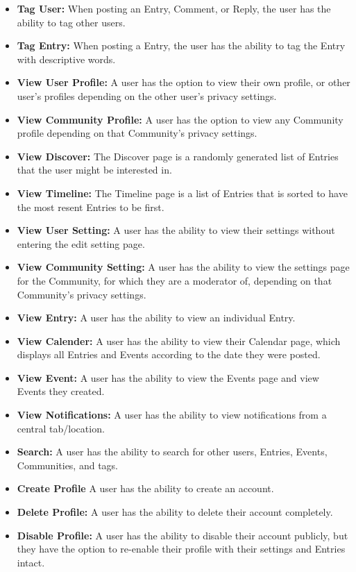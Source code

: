 \documentclass[letterpaper, 10, draftclsnofoot, onecolumn]{IEEEtran}
\begin{document}
\begin{itemize}
\item \textbf{Tag User: } When posting an Entry, Comment, or Reply, the user has the ability to tag other users.
\item \textbf{Tag Entry: } When posting a Entry, the user has the ability to tag the Entry with descriptive words.

\item \textbf{View User Profile: } A user has the option to view their own profile, or other user's profiles depending on the other user's privacy settings.
\item \textbf{View Community Profile: } A user has the option to view any Community profile depending on that Community's privacy settings.
\item \textbf{View Discover: } The Discover page is a randomly generated list of Entries that the user might be interested in.
\item \textbf{View Timeline: } The Timeline page is a list of Entries that is sorted to have the most resent Entries to be first.
\item \textbf{View User Setting: } A user has the ability to view their settings without entering the edit setting page.
\item \textbf{View Community Setting: } A user has the ability to view the settings page for the Community, for which they are a moderator of, depending on that Community's privacy settings.
\item \textbf{View Entry: } A user has the ability to view an individual Entry.
\item \textbf{View Calender: } A user has the ability to view their Calendar page, which displays all Entries and Events according to the date they were posted.
\item \textbf{View Event: } A user has the ability to view the Events page and view Events they created.
\item \textbf{View Notifications: } A user has the ability to view notifications from a central tab/location.

\item \textbf{Search: } A user has the ability to search for other users, Entries, Events, Communities, and tags.

\item \textbf{Create Profile} A user has the ability to create an account.
\item \textbf{Delete Profile: } A user has the ability to delete their account completely.
\item \textbf{Disable Profile: } A user has the ability to disable their account publicly, but they have the option to re-enable their profile with their settings and Entries intact.

\end{itemize}
\end{document}
